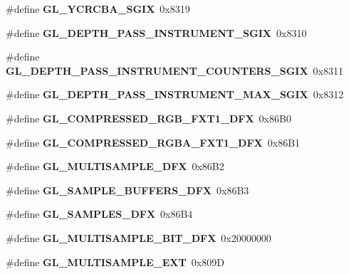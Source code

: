 \begin{DoxyCompactItemize}
\item 
\#define {\bfseries G\+L\+\_\+\+Y\+C\+R\+C\+B\+A\+\_\+\+S\+G\+I\+X}~0x8319\label{_s_d_l__opengl_8h_a48d77f55bf86b57069819f0557986a54}

\item 
\#define {\bfseries G\+L\+\_\+\+D\+E\+P\+T\+H\+\_\+\+P\+A\+S\+S\+\_\+\+I\+N\+S\+T\+R\+U\+M\+E\+N\+T\+\_\+\+S\+G\+I\+X}~0x8310\label{_s_d_l__opengl_8h_a5b2f8de2d490251b8b3d16f220a48cdc}

\item 
\#define {\bfseries G\+L\+\_\+\+D\+E\+P\+T\+H\+\_\+\+P\+A\+S\+S\+\_\+\+I\+N\+S\+T\+R\+U\+M\+E\+N\+T\+\_\+\+C\+O\+U\+N\+T\+E\+R\+S\+\_\+\+S\+G\+I\+X}~0x8311\label{_s_d_l__opengl_8h_aa94a73218c8abf2abce11b4c5e9dec53}

\item 
\#define {\bfseries G\+L\+\_\+\+D\+E\+P\+T\+H\+\_\+\+P\+A\+S\+S\+\_\+\+I\+N\+S\+T\+R\+U\+M\+E\+N\+T\+\_\+\+M\+A\+X\+\_\+\+S\+G\+I\+X}~0x8312\label{_s_d_l__opengl_8h_afe85c63abb51391351c3a4692632a6f1}

\item 
\#define {\bfseries G\+L\+\_\+\+C\+O\+M\+P\+R\+E\+S\+S\+E\+D\+\_\+\+R\+G\+B\+\_\+\+F\+X\+T1\+\_\+D\+F\+X}~0x86\+B0\label{_s_d_l__opengl_8h_a059c06b172591c0e27cc913297d42604}

\item 
\#define {\bfseries G\+L\+\_\+\+C\+O\+M\+P\+R\+E\+S\+S\+E\+D\+\_\+\+R\+G\+B\+A\+\_\+\+F\+X\+T1\+\_\+D\+F\+X}~0x86\+B1\label{_s_d_l__opengl_8h_aec1ad65583b8165141af6675bb3dd5a1}

\item 
\#define {\bfseries G\+L\+\_\+\+M\+U\+L\+T\+I\+S\+A\+M\+P\+L\+E\+\_\+D\+F\+X}~0x86\+B2\label{_s_d_l__opengl_8h_aafae57a5a4f7a17902f3da1594fcdd24}

\item 
\#define {\bfseries G\+L\+\_\+\+S\+A\+M\+P\+L\+E\+\_\+\+B\+U\+F\+F\+E\+R\+S\+\_\+D\+F\+X}~0x86\+B3\label{_s_d_l__opengl_8h_a6d6b6d9a799c083809ea0f754b339a1e}

\item 
\#define {\bfseries G\+L\+\_\+\+S\+A\+M\+P\+L\+E\+S\+\_\+D\+F\+X}~0x86\+B4\label{_s_d_l__opengl_8h_acebe0cf342250571b717e67a02b2340c}

\item 
\#define {\bfseries G\+L\+\_\+\+M\+U\+L\+T\+I\+S\+A\+M\+P\+L\+E\+\_\+\+B\+I\+T\+\_\+D\+F\+X}~0x20000000\label{_s_d_l__opengl_8h_aa419aee3cd184688383018946b0db728}

\item 
\#define {\bfseries G\+L\+\_\+\+M\+U\+L\+T\+I\+S\+A\+M\+P\+L\+E\+\_\+\+E\+X\+T}~0x809\+D\label{_s_d_l__opengl_8h_afad1c9789883e41bbc5c46800b9ea75e}


\end{DoxyCompactItemize}
